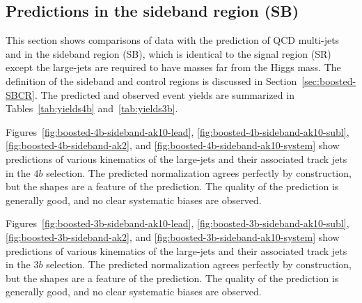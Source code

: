 \subsection{Predictions in the sideband region (SB)}
\label{sec:boosted-sb}

This section shows comparisons of data with the prediction of QCD multi-jets and \ttbar in the sideband region (SB), which is identical to the signal region (SR) except the large-\R jets are required to have masses far from the Higgs mass. The definition of the sideband and control regions is discussed in Section~\ref{sec:boosted-SBCR}. The predicted and observed event yields are summarized in Tables~\ref{tab:yields4b} and~\ref{tab:yields3b}.

Figures~\ref{fig:boosted-4b-sideband-ak10-lead}, \ref{fig:boosted-4b-sideband-ak10-subl}, \ref{fig:boosted-4b-sideband-ak2},  and \ref{fig:boosted-4b-sideband-ak10-system} show predictions of various kinematics of the large-\R jets and their associated track jets in the $4b$ selection. The predicted normalization agrees perfectly by construction, but the shapes are a feature of the prediction. The quality of the prediction is generally good, and no clear systematic biases are observed.


Figures~\ref{fig:boosted-3b-sideband-ak10-lead}, \ref{fig:boosted-3b-sideband-ak10-subl}, \ref{fig:boosted-3b-sideband-ak2},  and \ref{fig:boosted-3b-sideband-ak10-system} show predictions of various kinematics of the large-\R jets and their associated track jets in the $3b$ selection. The predicted normalization agrees perfectly by construction, but the shapes are a feature of the prediction. The quality of the prediction is generally good, and no clear systematic biases are observed.


